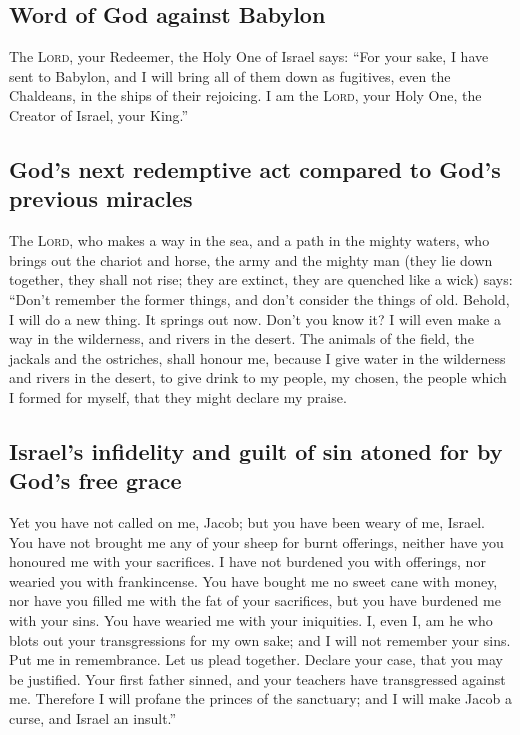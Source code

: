 \hypertarget{word-of-god-against-babylon}{%
\subsection{Word of God against
Babylon}\label{word-of-god-against-babylon}}

 The \textsc{Lord}, your Redeemer, the Holy One of Israel
says: ``For your sake, I have sent to Babylon, and I will bring all of
them down as fugitives, even the Chaldeans, in the ships of their
rejoicing.  I am the \textsc{Lord}, your Holy One, the
Creator of Israel, your King.''

\hypertarget{gods-next-redemptive-act-compared-to-gods-previous-miracles}{%
\subsection{God's next redemptive act compared to God's previous
miracles}\label{gods-next-redemptive-act-compared-to-gods-previous-miracles}}

 The \textsc{Lord}, who makes a way in the sea, and a
path in the mighty waters,  who brings out the chariot
and horse, the army and the mighty man (they lie down together, they
shall not rise; they are extinct, they are quenched like a wick) says:
 ``Don't remember the former things, and don't consider
the things of old.  Behold, I will do a new thing. It
springs out now. Don't you know it? I will even make a way in the
wilderness, and rivers in the desert.  The animals of the
field, the jackals and the ostriches, shall honour me, because I give
water in the wilderness and rivers in the desert, to give drink to my
people, my chosen,  the people which I formed for myself,
that they might declare my praise.

\hypertarget{israels-infidelity-and-guilt-of-sin-atoned-for-by-gods-free-grace}{%
\subsection{Israel's infidelity and guilt of sin atoned for by God's
free
grace}\label{israels-infidelity-and-guilt-of-sin-atoned-for-by-gods-free-grace}}

 Yet you have not called on me, Jacob; but you have been
weary of me, Israel.  You have not brought me any of your
sheep for burnt offerings, neither have you honoured me with your
sacrifices. I have not burdened you with offerings, nor wearied you with
frankincense.  You have bought me no sweet cane with
money, nor have you filled me with the fat of your sacrifices, but you
have burdened me with your sins. You have wearied me with your
iniquities.  I, even I, am he who blots out your
transgressions for my own sake; and I will not remember your sins.
 Put me in remembrance. Let us plead together. Declare
your case, that you may be justified.  Your first father
sinned, and your teachers have transgressed against me. 
Therefore I will profane the princes of the sanctuary; and I will make
Jacob a curse, and Israel an insult.''

